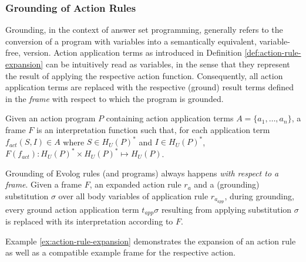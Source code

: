 
\subsubsection{Grounding of Action Rules}
\label{subsubsec:evolog-actions-semantics-grounding}

Grounding, in the context of answer set programming, generally refers to the conversion of a program with variables into a semantically equivalent, variable-free, version. Action application terms as introduced in Definition \ref{def:action-rule-expansion} can be intuitively read as variables, in the sense that they represent the result of applying the respective action function. Consequently, all action application terms are replaced with the respective (ground) result terms defined in the \emph{frame} with respect to which the program is grounded.

\begin{definition}[Frame]
\label{def:evolog-frame}
Given an action program $P$ containing action application terms $A = \{a_1,\ldots,a_n\}$, a frame $F$ is an interpretation function such that, for each application term $f_{act}(S, I) \in A$ where $S \in H_{U}(P)^{*}$ and $I \in H_{U}(P)^{*}$, $F(f_{act}): H_{U}(P)^{*} \times H_{U}(P)^{*} \mapsto H_{U}(P)$.
\end{definition}

\begin{definition}
\label{def:evolog-grounding}
Grounding of Evolog rules (and programs) always happens \emph{with respect to a frame}. Given a frame $F$, an expanded action rule $r_a$ and a (grounding) substitution $\sigma$ over all body variables of application rule $r_{a_{app}}$, during grounding, every ground action application term $t_{app}\sigma$ resulting from applying substitution $\sigma$ is replaced with its interpretation according to $F$.
\end{definition}

Example \ref{ex:action-rule-expansion} demonstrates the expansion of an action rule as well as a compatible example frame for the respective action.

